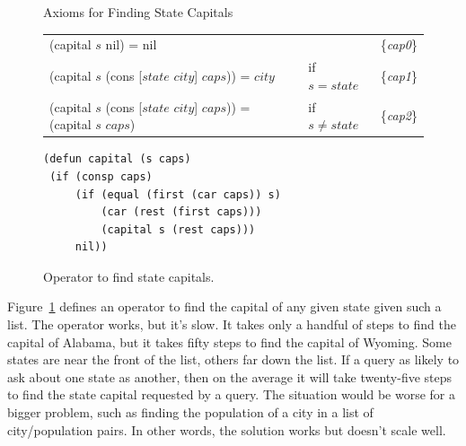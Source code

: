 \begin{figure}
\begin{center}
Axioms for Finding State Capitals
\begin{spacing}{0.9}
\begin{tabular}{lll}
\hline
(\textsf{capital} $s$ nil) = nil                               &             & \{\emph{cap0}\} \\
(\textsf{capital} $s$ (\textsf{cons} [$state$ $city$] $caps$)) = $city$ &if $s=state$ & \{\emph{cap1}\} \\
(\textsf{capital} $s$ (\textsf{cons} [$state$ $city$] $caps$)) = (\textsf{capital} $s$ $caps$) & if $s \neq state$ & \{\emph{cap2}\} \\
\end{tabular}
\end{spacing}
\begin{code}
\begin{verbatim}
(defun capital (s caps)
 (if (consp caps)
     (if (equal (first (car caps)) s)
         (car (rest (first caps)))
         (capital s (rest caps)))
     nil))
\end{verbatim}
\end{code}
\caption{Operator to find state capitals.}
\label{fig:state-capital-operator}
\end{center}
\end{figure}

Figure~\ref{fig:state-capital-operator}
defines an operator to find the
capital of any given state given such a list.
The operator works, but it's slow.
It takes only a handful of steps to find the capital of Alabama,
but it takes fifty steps to find the capital of Wyoming.
Some states are near the front of the list,
others far down the list.
If a query as likely to ask about
one state as another,
then on the average it will take twenty-five steps to find
the state capital requested by a query.
The situation would be worse for a bigger problem,
such as finding the population of a city in a list of city/population pairs.
In other words, the solution works but doesn't scale well.

